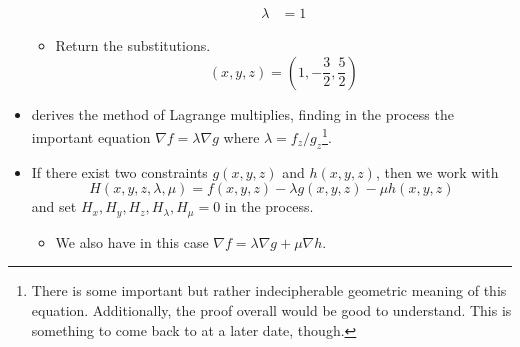\documentclass[../main.tex]{subfiles}
\begin{document}
\begin{itemize}
\begin{itemize}
\begin{align*}
            \lambda &= 1
        \end{align*}
        \item Return the substitutions.
        \begin{equation*}
            (x,y,z) = \left( 1,-\frac{3}{2},\frac{5}{2} \right)
        \end{equation*}
    \end{itemize}
    \item \textcite{bib:Thomas} derives the method of Lagrange multiplies, finding in the process the important equation $\nabla f=\lambda\nabla g$ where $\lambda=f_z/g_z$\footnote{There is some important but rather indecipherable geometric meaning of this equation. Additionally, the proof overall would be good to understand. This is something to come back to at a later date, though.}.
    \item If there exist two constraints $g(x,y,z)$ and $h(x,y,z)$, then we work with
    \begin{equation*}
        H(x,y,z,\lambda,\mu) = f(x,y,z)-\lambda g(x,y,z)-\mu h(x,y,z)
    \end{equation*}
    and set $H_x,H_y,H_z,H_\lambda,H_\mu=0$ in the process.
    \begin{itemize}
        \item We also have in this case $\nabla f=\lambda\nabla g+\mu\nabla h$.
    \end{itemize}
\end{itemize}
\end{document}
